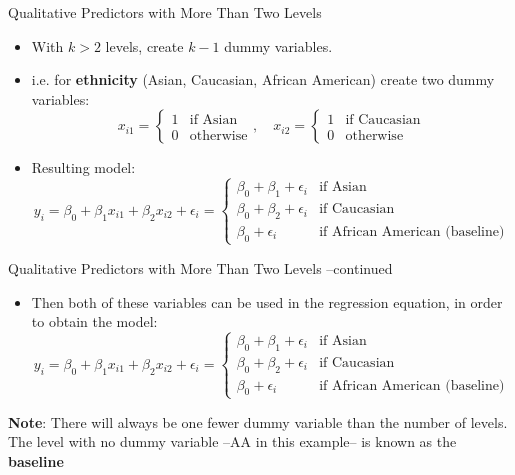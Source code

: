 \documentclass[aspectratio=169, 11pt]{beamer}
\begin{document}
\begin{frame}{Qualitative Predictors with More Than Two Levels}
  \begin{itemize}
    \item With $k > 2$ levels, create $k-1$ dummy variables.
    \item i.e. for \textbf{ethnicity} (Asian, Caucasian, African American) create two dummy variables:
    \[ x_{i1} = \begin{cases} 1 & \text{if Asian} \\ 0 & \text{otherwise} \end{cases}, \quad x_{i2} = \begin{cases} 1 & \text{if Caucasian} \\ 0 & \text{otherwise} \end{cases} \]
    \item Resulting model:
    \[ y_i = \beta_0 + \beta_1 x_{i1} + \beta_2 x_{i2} + \epsilon_i = \begin{cases} \beta_0 + \beta_1 + \epsilon_i & \text{if Asian} \\ \beta_0 + \beta_2 + \epsilon_i & \text{if Caucasian} \\ \beta_0 + \epsilon_i & \text{if African American (baseline)} \end{cases} \]
  \end{itemize}
\end{frame}

\begin{frame}{Qualitative Predictors with More Than Two Levels --continued}
  \begin{itemize}
    \item Then both of these variables can be used in the regression equation, in order to obtain the model:
    \[ y_i = \beta_0 + \beta_1 x_{i1} + \beta_2 x_{i2} + \epsilon_i = \begin{cases} \beta_0 + \beta_1 + \epsilon_i & \text{if Asian} \\ \beta_0 + \beta_2 + \epsilon_i & \text{if Caucasian} \\ \beta_0 + \epsilon_i & \text{if African American (baseline)} \end{cases} \]
  \end{itemize}
  \vspace{15mm}
  {\small \textbf{Note}: There will always be one fewer dummy variable than the number of levels.  The level with no dummy variable --AA in this example-- is known as the \textbf{baseline}}
\end{frame}
\end{document}
